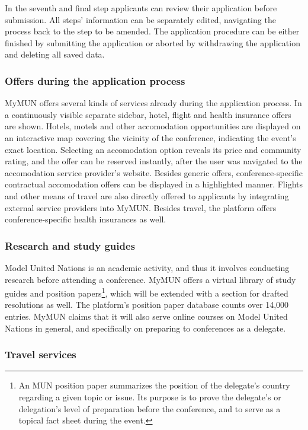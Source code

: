 In the seventh and final step applicants can review their application before submission. All steps' information can be separately edited, navigating the process back to the step to be amended. The application procedure can be either finished by submitting the application or aborted by withdrawing the application and deleting all saved data.

\subsubsection{Offers during the application process}

MyMUN offers several kinds of services already during the application process. In a continuously visible separate sidebar, hotel, flight and health insurance offers are shown. Hotels, motels and other accomodation opportunities are displayed on an interactive map covering the vicinity of the conference, indicating the event's exact location. Selecting an accomodation option reveals its price and community rating, and the offer can be reserved instantly, after the user was navigated to the accomodation service provider's website. Besides generic offers, conference-specific contractual accomodation offers can be displayed in a highlighted manner. Flights and other means of travel are also directly offered to applicants by integrating external service providers into MyMUN. Besides travel, the platform offers conference-specific health insurances as well.

\subsubsection{Research and study guides}

Model United Nations is an academic activity, and thus it involves conducting research before attending a conference. MyMUN offers a virtual library of study guides and position papers\footnote{An MUN position paper summarizes the position of the delegate's country regarding a given topic or issue. Its purpose is to prove the delegate's or delegation's level of preparation before the conference, and to serve as a topical fact sheet during the event.}, which will be extended with a section for drafted resolutions as well. The platform's position paper database counts over 14,000 entries. MyMUN claims that it will also serve online courses on Model United Nations in general, and specifically on preparing to conferences as a delegate.

\subsubsection{Travel services}

